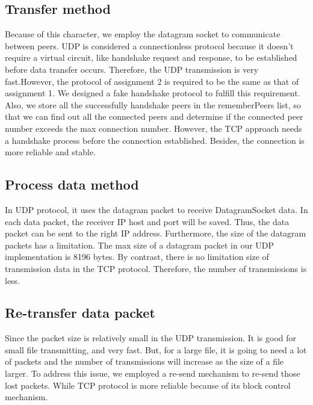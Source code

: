 \documentclass[a4paper,10pt,titlepage,twocolumn]{article}
\begin{document}
    \subsection{Transfer method}
    Because of this character, we employ the datagram socket to communicate between peers. UDP is considered a connectionless protocol because it doesn't require a virtual circuit, like handshake request and response, to be established before data transfer occurs. Therefore, the UDP transmission is very fast.However, the protocol of assignment 2 is required to be the same as that of assignment 1. We designed a fake handshake protocol to fulfill this requirement. Also, we store all the successfully handshake peers in the rememberPeers list, so that we can find out all the connected peers and determine if the connected peer number exceeds the max connection number. However, the TCP approach needs a handshake process before the connection established. Besides, the connection is more reliable and stable.
    \subsection{Process data method}    
    In UDP protocol, it uses the datagram packet to receive DatagramSocket data. In each data packet, the receiver IP host and port will be saved. Thus, the data packet can be sent to the right IP address. Furthermore, the size of the datagram packets has a limitation. The max size of a datagram packet in our UDP implementation is 8196 bytes. By contrast, there is no limitation size of transmission data in the TCP protocol. Therefore, the number of transmissions is less.
    \subsection{Re-transfer data packet}    
    Since the packet size is relatively small in the UDP transmission. It is good for small file transmitting, and very fast. But, for a large file, it is going to need a lot of packets and the number of transmissions will increase as the size of a file larger. To address this issue, we employed a re-send mechanism to re-send those lost packets. While TCP protocol is more reliable because of its block control mechanism.
\end{document}

